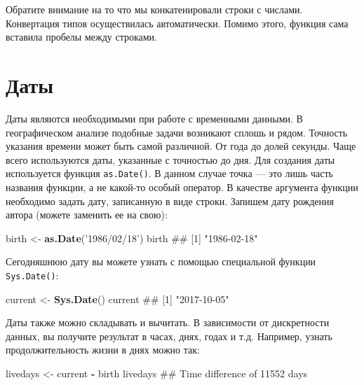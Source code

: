 \documentclass[]{book}
\newenvironment{Shaded}{\begin{snugshade}}{\end{snugshade}}
\newcommand{\KeywordTok}[1]{\textcolor[rgb]{0.13,0.29,0.53}{\textbf{#1}}}
\newcommand{\StringTok}[1]{\textcolor[rgb]{0.31,0.60,0.02}{#1}}
\newcommand{\OperatorTok}[1]{\textcolor[rgb]{0.81,0.36,0.00}{\textbf{#1}}}
\newcommand{\NormalTok}[1]{#1}
\begin{document}
Обратите внимание на то что мы конкатенировали строки с числами.
Конвертация типов осуществилась автоматически. Помимо этого, функция
сама вставила пробелы между строками.

\section{Даты}\label{dates}

Даты являются необходимыми при работе с временными данными. В
географическом анализе подобные задачи возникают сплошь и рядом.
Точность указания времени может быть самой различной. От года до долей
секунды. Чаще всего используются даты, указанные с точностью до дня. Для
создания даты используется функция \texttt{as.Date()}. В данном случае
точка --- это лишь часть названия функции, а не какой-то особый
оператор. В качестве аргумента функции необходимо задать дату,
записанную в виде строки. Запишем дату рождения автора (можете заменить
ее на свою):

\begin{Shaded}
\begin{Highlighting}[]
\NormalTok{birth <-}\StringTok{ }\KeywordTok{as.Date}\NormalTok{(}\StringTok{'1986/02/18'}\NormalTok{)}
\NormalTok{birth}
\NormalTok{## [1] "1986-02-18"}
\end{Highlighting}
\end{Shaded}

Сегодняшнюю дату вы можете узнать с помощью специальной функции
\texttt{Sys.Date()}:

\begin{Shaded}
\begin{Highlighting}[]
\NormalTok{current <-}\StringTok{ }\KeywordTok{Sys.Date}\NormalTok{()}
\NormalTok{current}
\NormalTok{## [1] "2017-10-05"}
\end{Highlighting}
\end{Shaded}

Даты также можно складывать и вычитать. В зависимости от дискретности
данных, вы получите результат в часах, днях, годах и т.д. Например,
узнать продолжительность жизни в днях можно так:

\begin{Shaded}
\begin{Highlighting}[]
\NormalTok{livedays <-}\StringTok{ }\NormalTok{current }\OperatorTok{-}\StringTok{ }\NormalTok{birth}
\NormalTok{livedays}
\NormalTok{## Time difference of 11552 days}
\end{Highlighting}
\end{Shaded}
\end{document}
